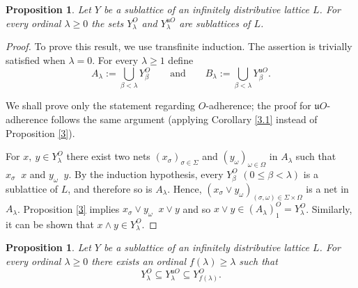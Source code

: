 \documentclass[12pt,a4paper]{amsart}
\numberwithin{equation}{section}
\newtheorem{prop}[thm]{Proposition}
\theoremstyle{definition}
\newcommand{\sss}[1]{{\scriptscriptstyle #1}}
\newcommand{\converges}[1]{\mathop{\overset{\text{#1}}{\longrightarrow}}}
\begin{document}
 

\begin{prop}\label{10.1}
Let $Y$ be a sublattice of an infinitely distributive lattice $ L$.  For every ordinal $\lambda\ge 0$ the sets $Y^{\sss{O}}_\lambda$ and $Y^{\sss{\mathfrak u}O}_\lambda$ are sublattices of $ L$.
\end{prop}
\begin{proof}
To prove this result, we use transfinite induction.  The assertion is trivially satisfied when $\lambda=0$.  For every $\lambda\ge 1$ define
\[A_\lambda:=\bigcup_{\beta<\lambda} Y^{\sss{O}}_\beta\qquad\text{and}\qquad B_\lambda:=\bigcup_{ \beta<\lambda}Y^{\sss{{\mathfrak u}O}}_\beta.\]

We shall prove only the statement regarding $O$-adherence; the proof for $\mathfrak{u}O$-adherence follows the same argument (applying Corollary \ref{3.1} instead of Proposition \ref{3}). 

For $x,\ y \in Y_{\lambda}^{\sss{O}}$  there exist two nets $(x_{\sigma})_{\sigma \in \Sigma}$ and $(y_\omega)_{\omega \in \Omega}$ in $A_\lambda$ such that $x_{\sigma} \converges{O} x$ and $y_{\omega} \converges{O} y$.  By the induction hypothesis, every $Y^{\sss{O}}_\beta$ $(0\le \beta<\lambda)$ is a sublattice of $ L$, and therefore so is $A_\lambda$.  Hence, $(x_{\sigma} \vee y_{\omega})_{(\sigma ,\omega) \in \Sigma \times \Omega}$ is a net in $A_\lambda$. Proposition \ref{3} implies $x_{\sigma} \vee y_{\omega} \converges{O} x \vee y$ and so  $x \vee y \in (A_\lambda)^{\sss{O}}_1=Y_{\lambda}^{\sss{O}}$.  Similarly, it can be shown that $x \wedge y \in Y_{\lambda}^{\sss{O}}$.
    \end{proof}
    



\begin{prop}\label{propInclusion}
Let $Y$ be a sublattice of an infinitely distributive lattice $ L$.  For every ordinal $\lambda\ge 0$ there exists an ordinal $f(\lambda)\ge \lambda$ such that 
\begin{equation}\label{e1}
    Y^{\sss{O}}_\lambda\subseteq Y^{\sss{\mathfrak u}O}_\lambda\subseteq Y^{\sss{O}}_{f(\lambda)}.
\end{equation}      
\end{prop}
\end{document}
